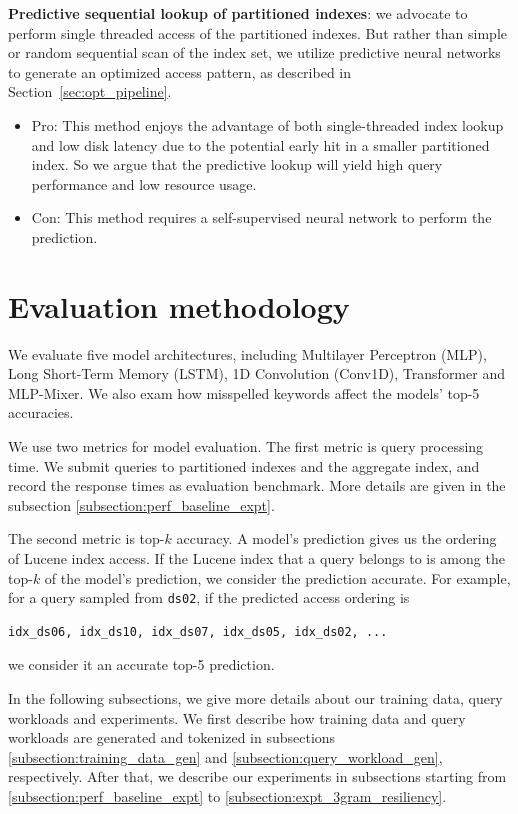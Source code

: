 \documentclass[conference]{IEEEtran}
\begin{document}
{\noindent \bf Predictive sequential lookup of partitioned indexes}: we advocate to perform single threaded  access of the partitioned indexes.  But rather than simple or random sequential scan of the index set, we utilize predictive neural networks to generate an optimized access pattern, as described in Section~\ref{sec:opt_pipeline}.

\begin{itemize}
    \item Pro: This method enjoys the advantage of both single-threaded index lookup and  low disk latency due to the potential early hit in a smaller partitioned index.  So we argue that the predictive lookup will yield high query performance and low resource usage.
    \item Con: This method requires a self-supervised neural network to perform the prediction.
\end{itemize}

\section{Evaluation methodology}
We evaluate five model architectures, including Multilayer Perceptron (MLP), Long Short-Term Memory (LSTM), 1D Convolution (Conv1D), Transformer and MLP-Mixer. We also exam how misspelled keywords affect the models' top-5 accuracies.

We use two metrics for model evaluation. The first metric is query processing time. We submit queries to partitioned indexes and the aggregate index, and record the response times as evaluation benchmark. More details are given in the subsection \ref{subsection:perf_baseline_expt}.

The second metric is top-$k$ accuracy. A model's prediction gives us the ordering of Lucene index access. If the Lucene index that a query belongs to is among the top-$k$ of the model's prediction, we consider the prediction accurate. For example, for a query sampled from \verb|ds02|, if the predicted access ordering is 
\begin{verbatim}
idx_ds06, idx_ds10, idx_ds07, idx_ds05, idx_ds02, ...
\end{verbatim}
we consider it an accurate top-5 prediction.

In the following subsections, we give more details about our training data, query workloads and experiments. We first describe how training data and query workloads are generated and tokenized in subsections \ref{subsection:training_data_gen} and \ref{subsection:query_workload_gen}, respectively. 
After that, we describe our experiments in subsections starting from  \ref{subsection:perf_baseline_expt} to  \ref{subsection:expt_3gram_resiliency}.
\end{document}
